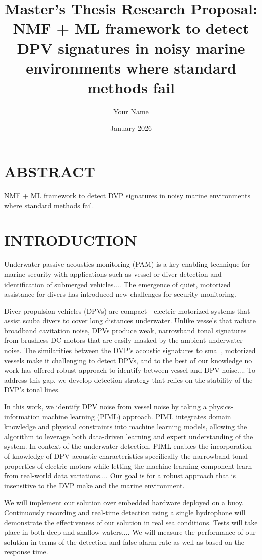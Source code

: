 \documentclass[12pt,a4paper]{article}
\title{\textbf{Master's Thesis Research Proposal: NMF + ML framework to detect DPV signatures in noisy marine environments where standard methods fail}}
\author{Your Name}
\date{January 2026}
\begin{document}
\maketitle
\onehalfspacing

\section*{ABSTRACT}
NMF + ML framework to detect DVP signatures in noisy marine environments where standard methods fail.

\section{INTRODUCTION}
Underwater passive acoustics monitoring (PAM) is a key enabling technique for marine security with
applications such as vessel or diver detection and identification of submerged vehicles.... The emergence
of quiet, motorized assistance for divers has introduced new challenges for security monitoring.

Diver propulsion vehicles (DPVs) are compact - electric motorized systems that assist scuba divers to
cover long distances underwater. Unlike vessels that radiate broadband cavitation noise, DPVs produce
weak, narrowband tonal signatures from brushless DC motors that are easily masked by the ambient
underwater noise. The similarities between the DVP's acoustic signatures to small, motorized vessels
make it challenging to detect DPVs, and to the best of our knowledge no work has offered robust approach
to identify between vessel and DPV noise.... To address this gap, we develop detection strategy that relies
on the stability of the DVP's tonal lines.

In this work, we identify DPV noise from vessel noise by taking a physics-information machine learning
(PIML) approach. PIML integrates domain knowledge and physical constraints into machine learning
models, allowing the algorithm to leverage both data-driven learning and expert understanding of the
system. In context of the underwater detection, PIML enables the incorporation of knowledge of DPV
acoustic characteristics specifically the narrowband tonal properties of electric motors while letting the
machine learning component learn from real-world data variations.... Our goal is for a robust approach that
is insensitive to the DVP make and the marine environment.

We will implement our solution over embedded hardware deployed on a buoy. Continuously recording
and real-time detection using a single hydrophone will demonstrate the effectiveness of our solution in
real sea conditions. Tests will take place in both deep and shallow waters.... We will measure the
performance of our solution in terms of the detection and false alarm rate as well as based on the
response time.
\end{document}
